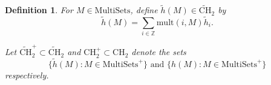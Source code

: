 \documentclass[11pt, oneside]{article}   	%
\newtheorem{lemma}{Lemma}
\newtheorem{definition}{Definition}
\newcommand{\ti}{\tilde{h}}
\newcommand{\mult}{\mathrm{mult}}
\newcommand{\semi}{\mathrm{semi}}
\newcommand{\tCH}{\tilde{\mathrm{CH}}_2}
\begin{document}

\begin{definition}
For $M \in \mathrm{MultiSets}$, define $\ti(M) \in \tCH$ by 
\[
\ti(M) = \sum_{i \in \mathbb{Z}} \mult(i,M)\ti_i.
\]

Let $\tCH^+ \subset \tCH$ and $\mathrm{CH}_2^+ \subset \mathrm{CH}_2$ denote the sets 
\[
\{ \ti(M) \colon M \in \mathrm{MultiSets}^+ \} \text{ and } \{ h(M) \colon M \in \mathrm{MultiSets}^+ \}
\]
respectively. 
\end{definition}

\end{document}
